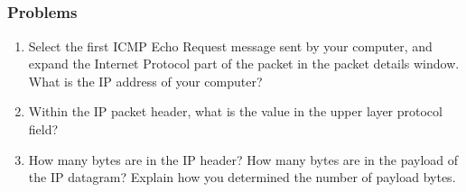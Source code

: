 \subsection{ }
    \subsubsection*{Problems}
    \begin{enumerate}[label=\bfseries Problem \arabic*:,leftmargin=*,labelindent=1em]
        \item Select the first ICMP Echo Request message sent by your computer, 
        and expand the Internet Protocol part of the packet in the packet details window.
        What is the IP address of your computer?\\[0.2mm]
        \soln
        \item Within the IP packet header, what is the value in the upper layer protocol field?\\[0.2mm]
        \soln
        \item How many bytes are in the IP header? 
        How many bytes are in the payload of the IP datagram? Explain how you determined the number of payload bytes.\\[0.2mm]
        \soln

\end{enumerate}
